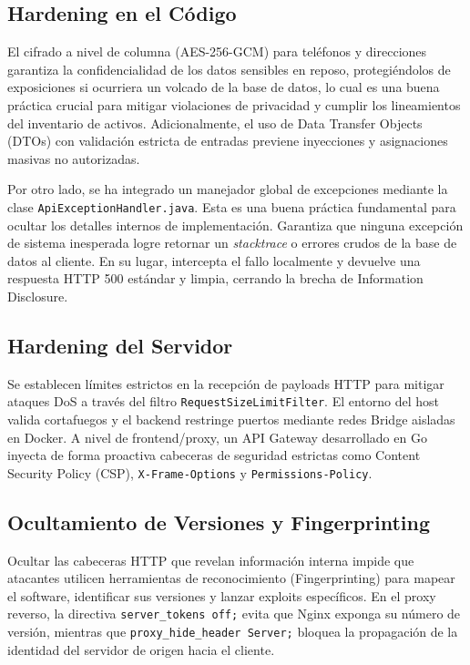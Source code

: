 \documentclass[11pt,oneside]{article}
\begin{document}
\subsection{Hardening en el Código}
El cifrado a nivel de columna (AES-256-GCM) para teléfonos y direcciones garantiza la confidencialidad de los datos sensibles en reposo, protegiéndolos de exposiciones si ocurriera un volcado de la base de datos, lo cual es una buena práctica crucial para mitigar violaciones de privacidad y cumplir los lineamientos del inventario de activos. Adicionalmente, el uso de Data Transfer Objects (DTOs) con validación estricta de entradas previene inyecciones y asignaciones masivas no autorizadas.

Por otro lado, se ha integrado un manejador global de excepciones mediante la clase \texttt{ApiExceptionHandler.java}. Esta es una buena práctica fundamental para ocultar los detalles internos de implementación. Garantiza que ninguna excepción de sistema inesperada logre retornar un \textit{stacktrace} o errores crudos de la base de datos al cliente. En su lugar, intercepta el fallo localmente y devuelve una respuesta HTTP 500 estándar y limpia, cerrando la brecha de Information Disclosure.

\subsection{Hardening del Servidor}
Se establecen límites estrictos en la recepción de payloads HTTP para mitigar ataques DoS a través del filtro \texttt{RequestSizeLimitFilter}. El entorno del host valida cortafuegos y el backend restringe puertos mediante redes Bridge aisladas en Docker.
A nivel de frontend/proxy, un API Gateway desarrollado en Go inyecta de forma proactiva cabeceras de seguridad estrictas como Content Security Policy (CSP), \texttt{X-Frame-Options} y \texttt{Permissions-Policy}.

\subsection{Ocultamiento de Versiones y Fingerprinting}
Ocultar las cabeceras HTTP que revelan información interna impide que atacantes utilicen herramientas de reconocimiento (Fingerprinting) para mapear el software, identificar sus versiones y lanzar exploits específicos. En el proxy reverso, la directiva \texttt{server\_tokens off;} evita que Nginx exponga su número de versión, mientras que \texttt{proxy\_hide\_header Server;} bloquea la propagación de la identidad del servidor de origen hacia el cliente.
\end{document}
